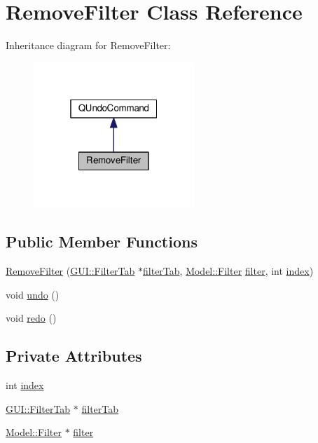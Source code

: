 \hypertarget{classUndoRedo_1_1RemoveFilter}{}\section{Remove\+Filter Class Reference}
\label{classUndoRedo_1_1RemoveFilter}


Inheritance diagram for Remove\+Filter\+:
\nopagebreak
\begin{figure}[H]
\begin{center}
\leavevmode
\includegraphics[width=172pt]{classUndoRedo_1_1RemoveFilter__inherit__graph}
\end{center}
\end{figure}
\subsection*{Public Member Functions}
\begin{DoxyCompactItemize}
\item 
\hyperlink{classUndoRedo_1_1RemoveFilter_a8b63e9ac41cea04880ca2f069c5336d9}{Remove\+Filter} (\hyperlink{classGUI_1_1FilterTab}{G\+U\+I\+::\+Filter\+Tab} $\ast$\hyperlink{classUndoRedo_1_1RemoveFilter_a47ca82534a740774d79998759818d9f4}{filter\+Tab}, \hyperlink{classModel_1_1Filter}{Model\+::\+Filter} \hyperlink{classUndoRedo_1_1RemoveFilter_a573678d67a3af0d81b06a4bb3a88957e}{filter}, int \hyperlink{classUndoRedo_1_1RemoveFilter_a750b5d744c39a06bfb13e6eb010e35d0}{index})
\item 
void \hyperlink{classUndoRedo_1_1RemoveFilter_a0e1e7804a53f6d62efc72c9bdbec8571}{undo} ()
\item 
void \hyperlink{classUndoRedo_1_1RemoveFilter_a93c48d6ed036e1a381be53ac67643284}{redo} ()
\end{DoxyCompactItemize}
\subsection*{Private Attributes}
\begin{DoxyCompactItemize}
\item 
int \hyperlink{classUndoRedo_1_1RemoveFilter_a750b5d744c39a06bfb13e6eb010e35d0}{index}
\item 
\hyperlink{classGUI_1_1FilterTab}{G\+U\+I\+::\+Filter\+Tab} $\ast$ \hyperlink{classUndoRedo_1_1RemoveFilter_a47ca82534a740774d79998759818d9f4}{filter\+Tab}
\item 
\hyperlink{classModel_1_1Filter}{Model\+::\+Filter} $\ast$ \hyperlink{classUndoRedo_1_1RemoveFilter_a573678d67a3af0d81b06a4bb3a88957e}{filter}
\end{DoxyCompactItemize}


